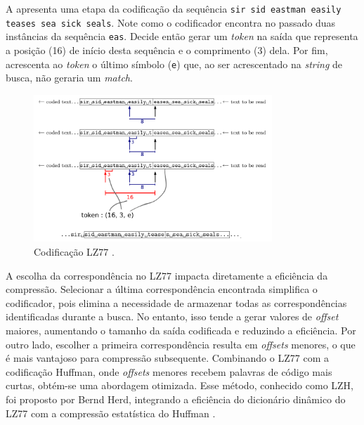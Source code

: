 A  apresenta uma etapa da codificação da sequência
\texttt{sir sid eastman easily teases sea sick seals}. Note como o codificador
encontra no passado duas instâncias da sequência \texttt{eas}. Decide então
gerar um \emph{token} na saída que representa a posição (16) de início desta sequência
e o comprimento (3) dela. Por fim, acrescenta ao \emph{token} o último símbolo (\texttt{e})
que, ao ser acrescentado na \emph{string} de busca, não geraria um \emph{match}.

  \begin{figure}[h]
  \centering
  \includegraphics[width=0.8\textwidth]{figures/lz77_schema.png}
  \caption{Codificação LZ77 \parencite{salomon2007}.}
  \label{fig:lz77_schema}
  \end{figure}


A escolha da correspondência no LZ77 impacta diretamente a eficiência da
compressão. Selecionar a última correspondência encontrada simplifica o
codificador, pois elimina a necessidade de armazenar todas as
correspondências identificadas durante a busca. No entanto, isso tende a
gerar valores de \textit{offset} maiores, aumentando o tamanho da saída
codificada e reduzindo a eficiência. Por outro lado, escolher a primeira
correspondência resulta em \textit{offsets} menores, o que é mais vantajoso
para compressão subsequente. Combinando o LZ77 com a codificação Huffman,
onde \textit{offsets} menores recebem palavras de código mais curtas,
obtém-se uma abordagem otimizada. Esse método, conhecido como LZH, foi
proposto por Bernd Herd, integrando a eficiência do dicionário dinâmico do
LZ77 com a compressão estatística do Huffman \parencite{salomon2007}.

